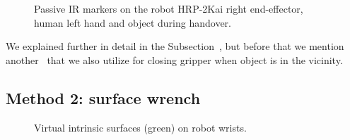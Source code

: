 \begin{figure}[ht]
	\caption{Passive IR markers on the robot HRP-2Kai right end-effector, human left hand and object during handover.}
	\label{fig:markerEf2}
\end{figure} 

We explained further in detail in the Subsection~, but before that we mention another~ that we also utilize for closing gripper when object is in the vicinity.



\subsection{Method 2: surface wrench}\label{surface wrench}

\begin{figure}[ht]
	\caption{Virtual intrinsic surfaces (green) on robot wrists.}
	\label{fig:wrist-surface2}
\end{figure}

